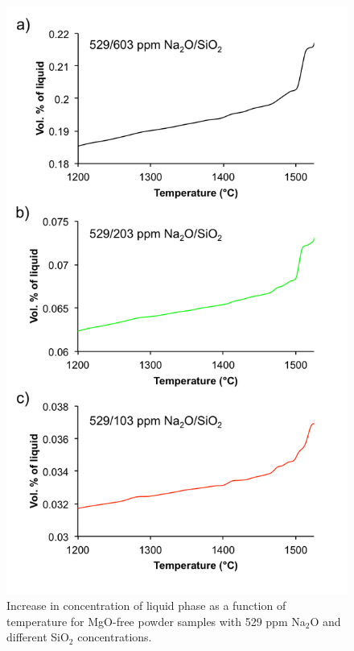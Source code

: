 \newpage
\begin{figure}[H]
	\centering
	\includegraphics{Chapter-4/Figures/Figure1.png}
	\caption{Increase in concentration of liquid phase as a function of temperature for MgO-free powder samples with 529 ppm Na$_{2}$O and different SiO$_{2}$ concentrations.}
	\label{Ch4-figure:Figure1}
\end{figure}

